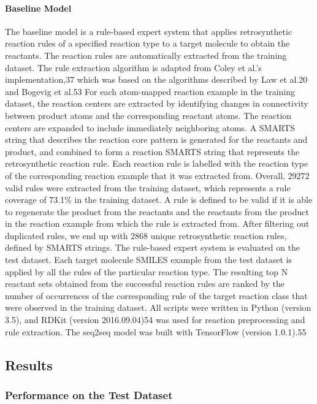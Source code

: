 \paragraph{Baseline Model}
The baseline model is a rule-based expert system that applies retrosynthetic reaction rules of a specified reaction type to a target molecule to obtain the reactants. The reaction rules are automatically extracted from the training dataset. The rule extraction algorithm is adapted from Coley et al.’s implementation,37 which was based on the algorithms described by Law et al.20 and Bogevig et al.53 For each atom-mapped reaction example in the training dataset, the reaction centers are extracted by identifying changes in connectivity between product atoms and the corresponding reactant atoms. The reaction centers are expanded to include immediately neighboring atoms. A SMARTS string that describes the reaction core pattern is generated for the reactants and product, and combined to form a reaction SMARTS string that represents the retrosynthetic reaction rule. Each reaction rule is labelled with the reaction type of the corresponding reaction example that it was extracted from. Overall, 29272 valid rules were extracted from the training dataset, which represents a rule coverage of 73.1\% in the training dataset. A rule is defined to be valid if it is able to regenerate the product from the reactants and the reactants from the product in the reaction example from which the rule is extracted from. After filtering out duplicated rules, we end up with 2868 unique retrosynthetic reaction rules, defined by SMARTS strings. 
The rule-based expert system is evaluated on the test dataset. Each target molecule SMILES example from the test dataset is applied by all the rules of the particular reaction type. The resulting top N reactant sets obtained from the successful reaction rules are ranked by the number of occurrences of the corresponding rule of the target reaction class that were observed in the training dataset.
All scripts were written in Python (version 3.5), and RDKit (version 2016.09.04)54 was used for reaction preprocessing and rule extraction. The seq2seq model was built with TensorFlow (version 1.0.1).55

\subsection{Results}

\subsubsection{Performance on the Test Dataset}

